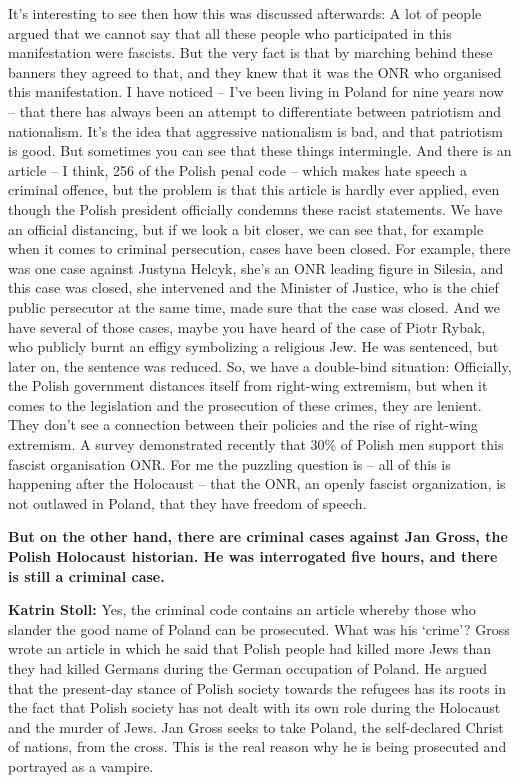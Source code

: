 It’s interesting to see then how this was discussed afterwards: A lot of people argued that we cannot say that all these people who participated in this manifestation were fascists. But the very fact is that by marching behind these banners they agreed to that, and they knew that it was the ONR who organised this manifestation. I have noticed – I’ve been living in Poland for nine years now – that there has always been an attempt to differentiate between patriotism and nationalism. It’s the idea that aggressive nationalism is bad, and that patriotism is good. But sometimes you can see that these things intermingle. And there is an article – I think, 256 of the Polish penal code – which makes hate speech a criminal offence, but the problem is that this article is hardly ever applied, even though the Polish president officially condemns these racist statements. We have an official distancing, but if we look a bit closer, we can see that, for example when it comes to criminal persecution, cases have been closed. For example, there was one case against Justyna Helcyk, she’s an ONR leading figure in Silesia, and this case was closed, she intervened and the Minister of Justice, who is the chief public persecutor at the same time, made sure that the case was closed. And we have several of those cases, maybe you have heard of the case of Piotr Rybak, who publicly burnt an effigy symbolizing a religious Jew. He was sentenced, but later on, the sentence was reduced. So, we have a double-bind situation: Officially, the Polish government distances itself from right-wing extremism, but when it comes to the legislation and the prosecution of these crimes, they are lenient. They don’t see a connection between their policies and the rise of right-wing extremism. A survey demonstrated recently that 30\% of Polish men support this fascist organisation ONR. For me the puzzling question is – all of this is happening after the Holocaust – that the ONR, an openly fascist organization, is not outlawed in Poland, that they have freedom of speech.  

\textbf{But on the other hand, there are criminal cases against Jan Gross, the Polish Holocaust historian. He was interrogated five hours, and there is still a criminal case.} 

\textbf{Katrin Stoll:} Yes, the criminal code contains an article whereby those who slander the good name of Poland can be prosecuted. What was his ‘crime’? Gross wrote an article in which he said that Polish people had killed more Jews than they had killed Germans during the German occupation of Poland. He argued that the present-day stance of Polish society towards the refugees has its roots in the fact that Polish society has not dealt with its own role during the Holocaust and the murder of Jews. Jan Gross seeks to take Poland, the self-declared Christ of nations, from the cross. This is the real reason why he is being prosecuted and portrayed as a vampire.  

